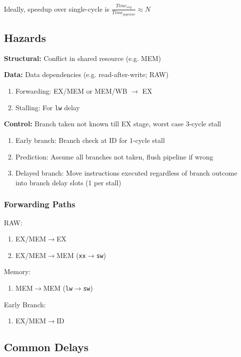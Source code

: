 \documentclass[12pt, a4paper]{article}
\begin{document}
\begin{multicols*}{3}
Ideally, speedup over single-cycle is $\frac{Time_{seq}}{Time_{pipeline}} \approx N$


\colbreak

\subsection{Hazards}
\textbf{Structural:} Conflict in shared resource (e.g. MEM)

\textbf{Data:} Data dependencies (e.g. read-after-write; RAW)
\begin{enumerate}[\roman*.]
  \item Forwarding: EX/MEM or MEM/WB $\rightarrow$ EX
  \item Stalling: For \lstinline|lw| delay
\end{enumerate}

\textbf{Control:} Branch taken not known till EX stage, worst case 3-cycle stall
\begin{enumerate}[\roman*.]
  \item Early branch: Branch check at ID for 1-cycle stall
  \item Prediction: Assume all branches not taken, flush pipeline if wrong
  \item Delayed branch: Move instructions executed regardless of branch outcome into branch delay slots (1 per stall) 
\end{enumerate}

\subsubsection{Forwarding Paths}
RAW:
\begin{enumerate}[\roman*.]
  \item EX/MEM$\rightarrow$EX
  \item EX/MEM$\rightarrow$MEM (\lstinline|xx|$\rightarrow$\lstinline|sw|)
\end{enumerate}

Memory:
\begin{enumerate}[\roman*.]
  \item MEM$\rightarrow$MEM (\lstinline|lw|$\rightarrow$\lstinline|sw|)
\end{enumerate}

Early Branch:
\begin{enumerate}[\roman*.]
  \item EX/MEM$\rightarrow$ID 
\end{enumerate}

\subsection{Common Delays}


\end{multicols*}
\end{document}
